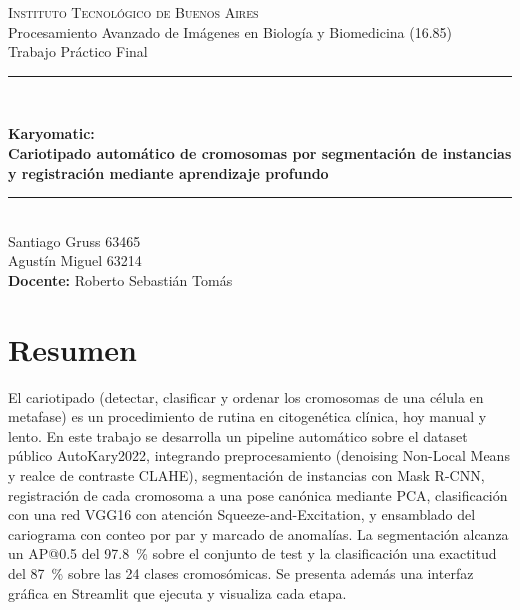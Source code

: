 \documentclass[11pt,a4paper]{article}
\begin{document}
\begin{titlepage}
  \centering
  \vspace*{1.5cm}

  {\Large\scshape Instituto Tecnológico de Buenos Aires}\\[0.4cm]
  {\large Procesamiento Avanzado de Imágenes en Biología y Biomedicina (16.85)}\\[0.2cm]
  {\large Trabajo Práctico Final}\\[2.5cm]

  \rule{\linewidth}{0.5pt}\\[0.6cm]
  {\huge\bfseries Karyomatic:\\[0.3cm]
    Cariotipado automático de cromosomas por segmentación de instancias y registración mediante aprendizaje profundo\par}
  \vspace{0.6cm}
  \rule{\linewidth}{0.5pt}\\[2.5cm]

  {\large Santiago Gruss 63465}\\[0.15cm]
  {\large Agustín Miguel 63214}\\[2cm]

  {\large\textbf{Docente:} Roberto Sebastián Tomás}\\[2cm]

\end{titlepage}

\section*{Resumen}

El cariotipado (detectar, clasificar y ordenar los cromosomas de una célula en
metafase) es un procedimiento de rutina en citogenética clínica, hoy manual y lento.
En este trabajo se desarrolla un pipeline automático sobre el dataset público
AutoKary2022, integrando preprocesamiento (denoising Non-Local Means y realce de
contraste CLAHE), segmentación de instancias con Mask R-CNN, registración de cada
cromosoma a una pose canónica mediante PCA, clasificación con una red VGG16 con
atención Squeeze-and-Excitation, y ensamblado del cariograma con conteo por par y
marcado de anomalías. La segmentación alcanza un AP@0.5 del \SI{97.8}{\percent} sobre
el conjunto de test y la clasificación una exactitud del \SI{87}{\percent} sobre las
24 clases cromosómicas. Se presenta además una interfaz gráfica en Streamlit que
ejecuta y visualiza cada etapa.
\end{document}
